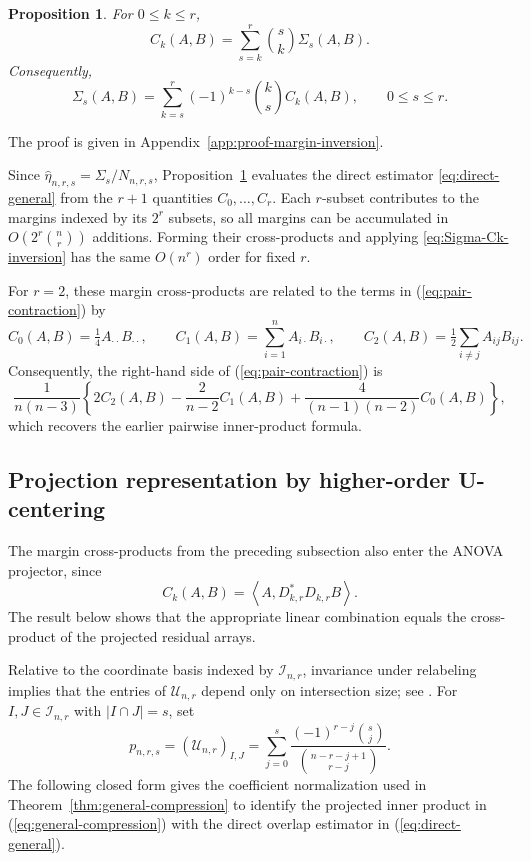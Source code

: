 \documentclass[11pt]{article}
\theoremstyle{plain}
\newtheorem{proposition}[theorem]{Proposition}
\theoremstyle{definition}
\theoremstyle{remark}
\newcommand{\cI}{\mathcal I}
\newcommand{\cU}{\mathcal U}
\newcommand{\inner}[2]{\left\langle #1,#2\right\rangle}
\begin{document}
\begin{proposition}
\label{prop:margin-inversion}
For $0\le k\le r$,
\begin{equation}\label{eq:Ck-Sigma}
 C_k(A,B)=\sum_{s=k}^r\binom{s}{k}\Sigma_s(A,B).
\end{equation}
Consequently,
\begin{equation}\label{eq:Sigma-Ck-inversion}
 \Sigma_s(A,B)
 =\sum_{k=s}^r(-1)^{k-s}\binom{k}{s}C_k(A,B),
 \qquad 0\le s\le r.
\end{equation}
\end{proposition}

\noindent The proof is given in
Appendix~\ref{app:proof-margin-inversion}.

Since $\widehat\eta_{n,r,s}=\Sigma_s/N_{n,r,s}$,
Proposition~\ref{prop:margin-inversion} evaluates the direct estimator
\eqref{eq:direct-general} from the $r+1$ quantities $C_0,\ldots,C_r$.
Each $r$-subset contributes to the margins indexed by its $2^r$ subsets, so
all margins can be accumulated in $O(2^r\binom nr)$ additions.  Forming their
cross-products and applying \eqref{eq:Sigma-Ck-inversion} has the same
$O(n^r)$ order for fixed $r$.

For $r=2$, these margin cross-products are related to the terms in
\textup{(\ref{eq:pair-contraction})} by
\[
 C_0(A,B)=\tfrac14A_{\cdot\cdot}B_{\cdot\cdot},\qquad
 C_1(A,B)=\sum_{i=1}^n A_{i\cdot}B_{i\cdot},\qquad
 C_2(A,B)=\tfrac12\sum_{i\ne j}A_{ij}B_{ij}.
\]
Consequently, the right-hand side of \textup{(\ref{eq:pair-contraction})} is
\[
 \frac{1}{n(n-3)}
 \left\{
 2C_2(A,B)-\frac{2}{n-2}C_1(A,B)
 +\frac{4}{(n-1)(n-2)}C_0(A,B)
 \right\},
\]
which recovers the earlier pairwise inner-product formula.


\subsection{Projection representation by higher-order U-centering}
The margin cross-products from the preceding subsection also enter the ANOVA
projector, since
\begin{equation*}
 C_k(A,B)=\inner{A}{D_{k,r}^{\ast}D_{k,r}B}.
\end{equation*}
The result below shows that the appropriate linear combination equals the
cross-product of the projected residual arrays.

Relative to the coordinate basis indexed by $\cI_{n,r}$, invariance under
relabeling implies that the entries of $\cU_{n,r}$ depend only on intersection
size; see \citet{Dunkl1978,Filmus2016}.  For $I,J\in\cI_{n,r}$ with
$|I\cap J|=s$, set
\begin{equation}\label{eq:p-s-def}
 p_{n,r,s}
 =(\cU_{n,r})_{I,J}
 =\sum_{j=0}^s
   \frac{(-1)^{r-j}\binom sj}{\binom{n-r-j+1}{r-j}}.
\end{equation}
The following closed form gives
the coefficient normalization used in Theorem~\ref{thm:general-compression}
to identify the projected inner product in \textup{(\ref{eq:general-compression})}
with the direct overlap estimator in \textup{(\ref{eq:direct-general})}.
\end{document}
